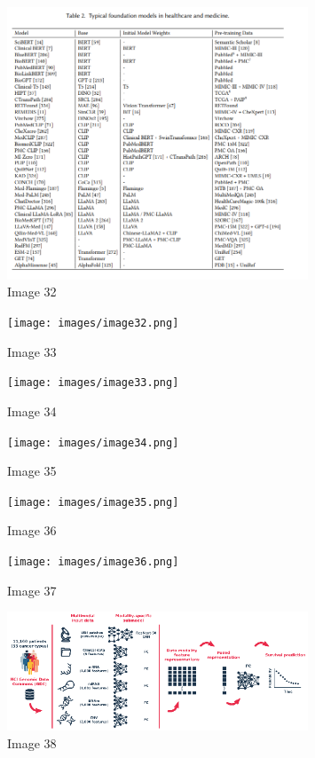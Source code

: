 \documentclass{article}%
\begin{document}
\begin{figure}[h!]%
\centering%
\includegraphics[width=0.8\textwidth]{images/image31.png}%
\caption{Image 32}%
\end{figure}

%


\begin{figure}[h!]%
\centering%
\texttt{[image: images/image32.png]}%
\caption{Image 33}%
\end{figure}

%


\begin{figure}[h!]%
\centering%
\texttt{[image: images/image33.png]}%
\caption{Image 34}%
\end{figure}

%


\begin{figure}[h!]%
\centering%
\texttt{[image: images/image34.png]}%
\caption{Image 35}%
\end{figure}

%


\begin{figure}[h!]%
\centering%
\texttt{[image: images/image35.png]}%
\caption{Image 36}%
\end{figure}

%


\begin{figure}[h!]%
\centering%
\texttt{[image: images/image36.png]}%
\caption{Image 37}%
\end{figure}

%


\begin{figure}[h!]%
\centering%
\includegraphics[width=0.8\textwidth]{images/image37.png}%
\caption{Image 38}%
\end{figure}
\end{document}
